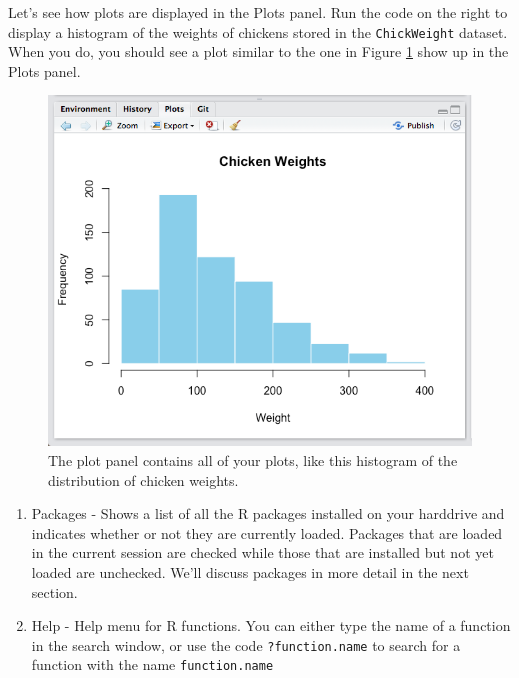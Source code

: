 \documentclass[
]{book}
\newenvironment{Shaded}{\begin{snugshade}}{\end{snugshade}}
\newcommand{\AttributeTok}[1]{\textcolor[rgb]{0.77,0.63,0.00}{#1}}
\newcommand{\FunctionTok}[1]{\textcolor[rgb]{0.00,0.00,0.00}{#1}}
\newcommand{\NormalTok}[1]{#1}
\newcommand{\SpecialCharTok}[1]{\textcolor[rgb]{0.00,0.00,0.00}{#1}}
\newcommand{\StringTok}[1]{\textcolor[rgb]{0.31,0.60,0.02}{#1}}
\begin{document}
Let's see how plots are displayed in the Plots panel. Run the code on the right to display a histogram of the weights of chickens stored in the \texttt{ChickWeight} dataset. When you do, you should see a plot similar to the one in Figure \ref{fig:plotpanel} show up in the Plots panel.

\begin{Shaded}
\end{Shaded}

\begin{figure}
\includegraphics[width=0.75\linewidth]{images/chapter-1/plotpanelss} \caption{The plot panel contains all of your plots, like this histogram of the distribution of chicken weights.}\label{fig:plotpanel}
\end{figure}

\begin{enumerate}
\def\labelenumi{\arabic{enumi}.}
\setcounter{enumi}{2}
\item
  Packages - Shows a list of all the R packages installed on your harddrive and indicates whether or not they are currently loaded. Packages that are loaded in the current session are checked while those that are installed but not yet loaded are unchecked. We'll discuss packages in more detail in the next section.
\item
  Help - Help menu for R functions. You can either type the name of a function in the search window, or use the code \texttt{?function.name} to search for a function with the name \texttt{function.name}
\end{enumerate}
\end{document}
